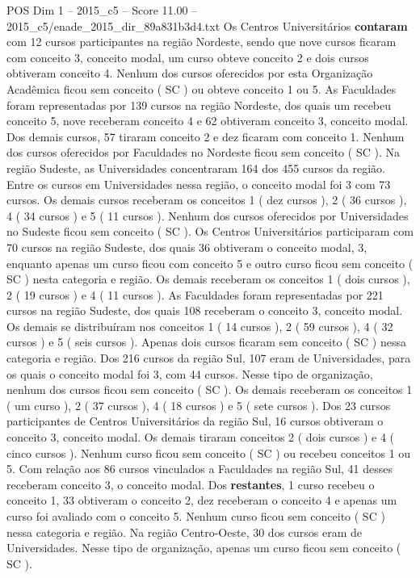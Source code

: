 \begin{textsample}{POS Dim 1 – 2015\_c5 – Score 11.00 – 2015\_c5/enade\_2015\_dir\_89a831b3d4.txt}
Os Centros Universitários \textbf{contaram} com 12 cursos participantes na região Nordeste, sendo que nove cursos ficaram com conceito 3, conceito modal, um curso obteve conceito 2 e dois cursos obtiveram conceito 4.
Nenhum dos cursos oferecidos por esta Organização Acadêmica ficou sem conceito ( SC ) ou obteve conceito 1 ou 5.
As Faculdades foram representadas por 139 cursos na região Nordeste, dos quais um recebeu conceito 5, nove receberam conceito 4 e 62 obtiveram conceito 3, conceito modal.
Dos demais cursos, 57 tiraram conceito 2 e dez ficaram com conceito 1.
Nenhum dos cursos oferecidos por Faculdades no Nordeste ficou sem conceito ( SC ).
Na região Sudeste, as Universidades concentraram 164 dos 455 cursos da região.
Entre os cursos em Universidades nessa região, o conceito modal foi 3 com 73 cursos.
Os demais cursos receberam os conceitos 1 ( dez cursos ), 2 ( 36 cursos ), 4 ( 34 cursos ) e 5 ( 11 cursos ).
Nenhum dos cursos oferecidos por Universidades no Sudeste ficou sem conceito ( SC ).
Os Centros Universitários participaram com 70 cursos na região Sudeste, dos quais 36 obtiveram o conceito modal, 3, enquanto apenas um curso ficou com conceito 5 e outro curso ficou sem conceito ( SC ) nesta categoria e região.
Os demais receberam os conceitos 1 ( dois cursos ), 2 ( 19 cursos ) e 4 ( 11 cursos ).
As Faculdades foram representadas por 221 cursos na região Sudeste, dos quais 108 receberam o conceito 3, conceito modal.
Os demais se distribuíram nos conceitos 1 ( 14 cursos ), 2 ( 59 cursos ), 4 ( 32 cursos ) e 5 ( seis cursos ).
Apenas dois cursos ficaram sem conceito ( SC ) nessa categoria e região.
Dos 216 cursos da região Sul, 107 eram de Universidades, para os quais o conceito modal foi 3, com 44 cursos.
Nesse tipo de organização, nenhum dos cursos ficou sem conceito ( SC ).
Os demais receberam os conceitos 1 ( um curso ), 2 ( 37 cursos ), 4 ( 18 cursos ) e 5 ( sete cursos ).
Dos 23 cursos participantes de Centros Universitários da região Sul, 16 cursos obtiveram o conceito 3, conceito modal.
Os demais tiraram conceitos 2 ( dois cursos ) e 4 ( cinco cursos ).
Nenhum curso ficou sem conceito ( SC ) ou recebeu conceitos 1 ou 5.
Com relação aos 86 cursos vinculados a Faculdades na região Sul, 41 desses receberam conceito 3, o conceito modal.
Dos \textbf{restantes}, 1 curso recebeu o conceito 1, 33 obtiveram o conceito 2, dez receberam o conceito 4 e apenas um curso foi avaliado com o conceito 5.
Nenhum curso ficou sem conceito ( SC ) nessa categoria e região.
Na região Centro-Oeste, 30 dos cursos eram de Universidades.
Nesse tipo de organização, apenas um curso ficou sem conceito ( SC ).

\end{textsample}
